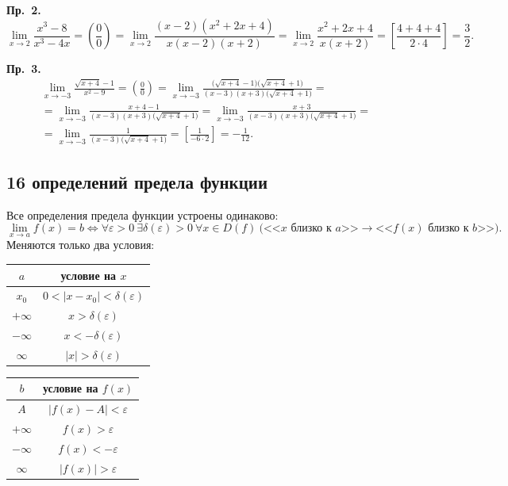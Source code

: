 \documentclass[a4paper,11pt]{article}
\begin{document}
\textbf{Пр.~2.}
\[
  \lim_{x \to 2} \frac{x^3 - 8}{x^3 - 4x}
  = \left(\frac{0}{0}\right)
  = \lim_{x \to 2} \frac{(x - 2)(x^2 + 2x + 4)}{x(x - 2)(x + 2)}
  = \lim_{x \to 2} \frac{x^2 + 2x + 4}{x(x + 2)}
  = \left[\frac{4 + 4 + 4}{2 \cdot 4}\right] = \frac{3}{2}.
\]

\textbf{Пр.~3.}
\begin{multline*}
  \lim_{x \to -3} \frac{\sqrt{x + 4} - 1}{x^2 - 9}
  = \left(\frac{0}{0}\right)
  = \lim_{x \to -3} \frac{\big(\sqrt{x + 4} - 1\big)\big(\sqrt{x + 4} + 1\big)}{(x - 3)(x + 3)\big(\sqrt{x + 4} + 1\big)} = \\
  = \lim_{x \to -3} \frac{x + 4 - 1}{(x - 3)(x + 3)\big(\sqrt{x + 4} + 1\big)}
  = \lim_{x \to -3} \frac{x + 3}{(x - 3)(x + 3)\big(\sqrt{x + 4} + 1\big)} = \\
  = \lim_{x \to -3} \frac{1}{(x - 3)\big(\sqrt{x + 4} + 1\big)}
  = \left[\frac{1}{-6 \cdot 2}\right] = -\frac{1}{12}.
\end{multline*}

\subsection{16 определений предела функции}

Все определения предела функции устроены одинаково:
\[
  \lim_{x \to a} f(x) = b \Leftrightarrow \forall \varepsilon > 0\ \exists \delta(\varepsilon) > 0\
  \forall x \in D(f)\ \bigl( \text{<<$x$ близко к $a$>>} \rightarrow \text{<<$f(x)$ близко к $b$>>} \bigr).
\]
Меняются только два условия:

\begin{center}
\renewcommand{\arraystretch}{1.3}
\begin{tabular}{|c|c|}
  \hline
  $a$ & условие на $x$ \\ \hline
  $x_0$ & $0 < |x - x_0| < \delta(\varepsilon)$ \\
  $+\infty$ & $x > \delta(\varepsilon)$ \\
  $-\infty$ & $x < -\delta(\varepsilon)$ \\
  $\infty$ & $|x| > \delta(\varepsilon)$ \\ \hline
\end{tabular}
\qquad
\begin{tabular}{|c|c|}
  \hline
  $b$ & условие на $f(x)$ \\ \hline
  $A$ & $|f(x) - A| < \varepsilon$ \\
  $+\infty$ & $f(x) > \varepsilon$ \\
  $-\infty$ & $f(x) < -\varepsilon$ \\
  $\infty$ & $|f(x)| > \varepsilon$ \\ \hline
\end{tabular}
\end{center}
\end{document}
